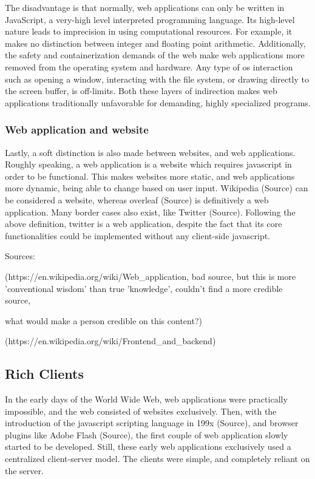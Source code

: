 The disadvantage is that normally, web applications can only be written in JavaScript, a very-high level interpreted programming language. 
Its high-level nature leads to imprecision in using computational resources. 
For example, it makes no distinction between integer and floating point arithmetic.  
Additionally, the safety and containerization demands of the web make web applications more removed from the operating system and hardware.
Any type of \ac{os} interaction such as opening a window, interacting with the file system, or drawing directly to the screen buffer, is off-limits.  
Both these layers of indirection makes web applications traditionally unfavorable for demanding, highly specialized programs. 

\subsubsection*{Web application and website}

Lastly, a soft distinction is also made between websites, and web applications. 
Roughly speaking, a web application is a website which requires javascript in order to be functional.
This makes websites more static, and web applications more dynamic, being able to change based on user input.  
Wikipedia (Source) can be considered a website, whereas overleaf (Source) is definitively a web application. 
Many border cases also exist, like Twitter (Source).
Following the above definition, twitter is a web application, despite the fact that its core functionalities could be implemented without any client-side javascript.

\begin{note}
  Sources: 

  (https://en.wikipedia.org/wiki/Web_application, bad source, but this is more 'conventional wisdom' than true 'knowledge', couldn't find a more credible source, 
  
  what would make a person credible on this content?)
  
  (https://en.wikipedia.org/wiki/Frontend_and_backend)
\end{note}


\subsection{Rich Clients}
\label{sec:background-web-rich}

In the early days of the World Wide Web, web applications were practically impossible, and the web consisted of websites exclusively. 
Then, with the introduction of the javascript scripting language in 199x (Source), and browser plugins like Adobe Flash (Source), the first couple of web application slowly started to be developed. 
Still, these early web applications exclusively used a centralized client-server model.
The clients were simple, and completely reliant on the server. 

